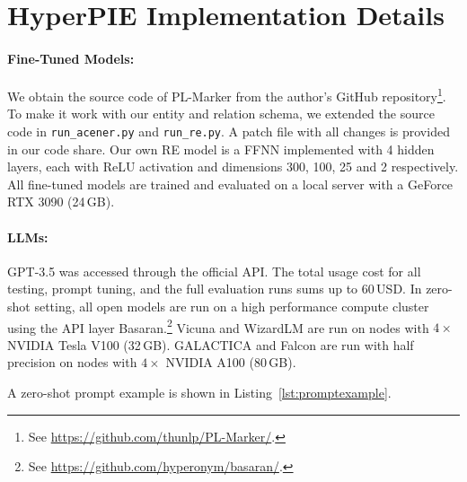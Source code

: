 \section{HyperPIE Implementation Details}\label{app:hyperpie-implementation-details}

\paragraph{Fine-Tuned Models:}
We obtain the source code of PL-Marker from the author's GitHub repository\footnote{See \url{https://github.com/thunlp/PL-Marker/}.}. To make it work with our entity and relation schema, we extended the source code in \texttt{run\_acener.py} and \texttt{run\_re.py}. A patch file with all changes is provided in our code share. Our own RE model is a FFNN implemented with 4 hidden layers, each with ReLU activation and dimensions 300, 100, 25 and 2 respectively. All fine-tuned models are trained and evaluated on a local server with a GeForce RTX 3090 (24\,GB).


\paragraph{LLMs:}
GPT-3.5 was accessed through the official API. The total usage cost for all testing, prompt tuning, and the full evaluation runs sums up to 60\,USD. In zero-shot setting, all open models are run on a high performance compute cluster using the API layer Basaran.\footnote{See \url{https://github.com/hyperonym/basaran/}.} Vicuna and WizardLM  are run on nodes with $4\times$ NVIDIA Tesla V100 (32\,GB). GALACTICA and Falcon are run with half precision on nodes with $4\times$ NVIDIA A100 (80\,GB).

A zero-shot prompt example is shown in Listing~\ref{lst:promptexample}.

